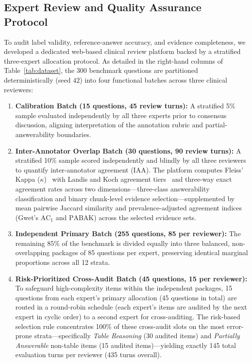 \documentclass[sn-mathphys, oneside]{sn-jnl}
\begin{document}
\subsection{Expert Review and Quality Assurance Protocol}
\label{subsec:expert_review_protocol}
To audit label validity, reference-answer accuracy, and evidence completeness, we developed a dedicated web-based clinical review platform backed by a stratified three-expert allocation protocol. As detailed in the right-hand columns of Table~\ref{tab:dataset}, the 300 benchmark questions are partitioned deterministically (seed $42$) into four functional batches across three clinical reviewers:
\begin{enumerate}
\item \textbf{Calibration Batch (15 questions, 45 review turns):} A stratified 5\% sample evaluated independently by all three experts prior to consensus discussion, aligning interpretation of the annotation rubric and partial-answerability boundaries.
\item \textbf{Inter-Annotator Overlap Batch (30 questions, 90 review turns):} A stratified 10\% sample scored independently and blindly by all three reviewers to quantify inter-annotator agreement (IAA). The platform computes Fleiss' Kappa ($\kappa$)~\cite{fleiss1971measuring} with Landis and Koch agreement tiers~\cite{landis1977measurement} and three-way exact agreement rates across two dimensions—three-class answerability classification and binary chunk-level evidence selection—supplemented by mean pairwise Jaccard similarity and prevalence-adjusted agreement indices (Gwet's $\mathrm{AC}_1$ and $\mathrm{PABAK}$) across the selected evidence sets.
\item \textbf{Independent Primary Batch (255 questions, 85 per reviewer):} The remaining 85\% of the benchmark is divided equally into three balanced, non-overlapping packages of 85 questions per expert, preserving identical marginal proportions across all 12 strata.
\item \textbf{Risk-Prioritized Cross-Audit Batch (45 questions, 15 per reviewer):} To safeguard high-complexity items within the independent packages, 15 questions from each expert's primary allocation (45 questions in total) are routed in a round-robin schedule (each expert's items are audited by the next expert in cyclic order) to a second expert for cross-auditing. The risk-based selection rule concentrates 100\% of these cross-audit slots on the most error-prone strata—specifically \emph{Table Reasoning} (30 audited items) and \emph{Partially Answerable} non-table items (15 audited items)—yielding exactly 145 total evaluation turns per reviewer (435 turns overall).
\end{enumerate}
\end{document}
